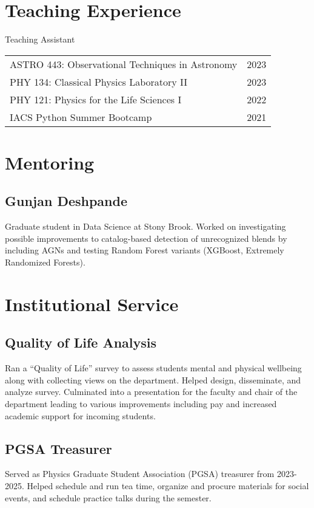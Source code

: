 \documentclass[a4paper,12pt]{article}
\begin{document}
\section{Teaching Experience}
Teaching Assistant

\begin{tabularx}{\linewidth}{@{}l X@{}}
	ASTRO 443: Observational Techniques in Astronomy & \hfill 2023 \\
	PHY 134: Classical Physics Laboratory II & \hfill 2023 \\
	PHY 121: Physics for the Life Sciences I & \hfill 2022 \\
	IACS Python Summer Bootcamp & \hfill 2021
\end{tabularx}


\section{Mentoring}
\begin{adjustwidth}{2.0cm}{}
	\subsection*{\hspace{-2cm}Gunjan Deshpande}
	Graduate student in Data Science at Stony Brook. Worked on investigating possible improvements to catalog-based detection of unrecognized blends by including AGNs and testing Random Forest variants (XGBoost, Extremely Randomized Forests).
\end{adjustwidth}

\section{Institutional Service}
\begin{adjustwidth}{2.0cm}{}
	\subsection*{\hspace{-2cm}Quality of Life Analysis}
	Ran a ``Quality of Life'' survey to assess students mental and physical wellbeing along with collecting views on the department. Helped design, disseminate, and analyze survey. Culminated into a presentation for the faculty and chair of the department leading to various improvements including pay and increased academic support for incoming students.
	\subsection*{\hspace{-2cm}PGSA Treasurer}
	Served as Physics Graduate Student Association (PGSA) treasurer from 2023-2025. Helped schedule and run tea time, organize and procure materials for social events, and schedule practice talks during the semester.
\end{adjustwidth}
\end{document}
